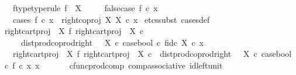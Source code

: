 \begin{isabellebody}
\ \ \ f{\isacharunderscore}{\kern0pt}type{\isacharbrackleft}{\kern0pt}type{\isacharunderscore}{\kern0pt}rule{\isacharbrackright}{\kern0pt}{\isacharcolon}{\kern0pt}\ {\isachardoublequoteopen}f\ {\isacharcolon}{\kern0pt}\ X\ {\isasymrightarrow}\ {\isasymOmega}{\isachardoublequoteclose}\isanewline
\ \ \ false{\isacharunderscore}{\kern0pt}case{\isacharcolon}{\kern0pt}\ {\isachardoublequoteopen}f\ {\isasymcirc}\isactrlsub c\ x\ {\isacharequal}{\kern0pt}\ {\isasymf}{\isachardoublequoteclose}\isanewline
\ \ \ {\isachardoublequoteopen}cases\ f\ {\isasymcirc}\isactrlsub c\ x\ {\isacharequal}{\kern0pt}\ right{\isacharunderscore}{\kern0pt}coproj\ X\ X\ {\isasymcirc}\isactrlsub c\ x{\isachardoublequoteclose}\isanewline
%
\isadelimproof
%
\endisadelimproof
%
\isatagproof
{}\isamarkupfalse%
\ {\isacharparenleft}{\kern0pt}etcs{\isacharunderscore}{\kern0pt}subst\ cases{\isacharunderscore}{\kern0pt}def{}{\isacharparenright}{\kern0pt}\ \ \isanewline
\ \ \isamarkupfalse%
\ {\isachardoublequoteopen}{\isacharparenleft}{\kern0pt}{\isacharparenleft}{\kern0pt}right{\isacharunderscore}{\kern0pt}cart{\isacharunderscore}{\kern0pt}proj\ {\isasymone}\ X\ {\isasymbowtie}\isactrlsub f\ right{\isacharunderscore}{\kern0pt}cart{\isacharunderscore}{\kern0pt}proj\ {\isasymone}\ X{\isacharparenright}{\kern0pt}\ {\isasymcirc}\isactrlsub c\isanewline
\ \ \ \ \ dist{\isacharunderscore}{\kern0pt}prod{\isacharunderscore}{\kern0pt}coprod{\isacharunderscore}{\kern0pt}right\ {\isasymone}\ {\isasymone}\ X\ {\isasymcirc}\isactrlsub c\ {\isasymlangle}case{\isacharunderscore}{\kern0pt}bool\ {\isasymcirc}\isactrlsub c\ f{\isacharcomma}{\kern0pt}id\isactrlsub c\ X{\isasymrangle}{\isacharparenright}{\kern0pt}\ {\isasymcirc}\isactrlsub c\ x\ \isanewline
\ \ {\isacharequal}{\kern0pt}\ {\isacharparenleft}{\kern0pt}right{\isacharunderscore}{\kern0pt}cart{\isacharunderscore}{\kern0pt}proj\ {\isasymone}\ X\ {\isasymbowtie}\isactrlsub f\ right{\isacharunderscore}{\kern0pt}cart{\isacharunderscore}{\kern0pt}proj\ {\isasymone}\ X{\isacharparenright}{\kern0pt}\ {\isasymcirc}\isactrlsub c\ \ dist{\isacharunderscore}{\kern0pt}prod{\isacharunderscore}{\kern0pt}coprod{\isacharunderscore}{\kern0pt}right\ {\isasymone}\ {\isasymone}\ X\ {\isasymcirc}\isactrlsub c\ {\isasymlangle}case{\isacharunderscore}{\kern0pt}bool\ {\isasymcirc}\isactrlsub c\ f\ {\isasymcirc}\isactrlsub c\ x{\isacharcomma}{\kern0pt}\ x{\isasymrangle}{\isachardoublequoteclose}\isanewline
\ \ \ \ \ \isamarkupfalse%
\ cfunc{\isacharunderscore}{\kern0pt}prod{\isacharunderscore}{\kern0pt}comp\ comp{\isacharunderscore}{\kern0pt}associative{}\ id{\isacharunderscore}{\kern0pt}left{\isacharunderscore}{\kern0pt}unit{}\ \ \isamarkupfalse%

\end{isabellebody}
